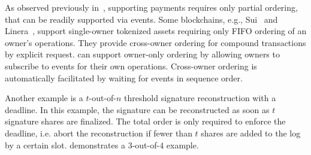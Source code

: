 As observed previously in~\cite{baudet2020fastpay, rocket2019scalable, guerraoui2019consensus}, supporting payments requires only partial ordering, that can be readily supported via \eagercommit events. 
Some blockchains, e.g., Sui~\cite{sui} and Linera~\cite{linera}, support single-owner tokenized assets requiring only FIFO ordering of an owner's operations. They provide cross-owner ordering for compound transactions by explicit request.
\system can support owner-only ordering by allowing owners to subscribe to \eagercommit events for their own operations. 
Cross-owner ordering is automatically facilitated by waiting for \commit events in sequence order.

%
Another example is a $t$-out-of-$n$ threshold signature reconstruction with a deadline.
In this example, the signature can be reconstructed as soon as $t$ signature shares are finalized.
The total order is only required to enforce the deadline, i.e. abort the reconstruction if fewer than $t$ shares are added to the log by a certain slot. 
 demonstrates a $3$-out-of-$4$ example.